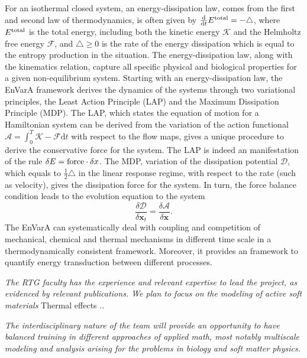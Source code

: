 \documentclass[11pt]{article}
\newcommand{\dd}{\mathrm{d}}
\newcommand{\x}{{\bm x}}
\begin{document}
For an isothermal closed system, an energy-dissipation law, comes from the first and second law of thermodynamics, is often given by $\frac{\dd}{\dd t} E^{\rm total} = - \triangle$,
where $E^{\rm total}$ is the total energy, including both the kinetic energy $\mathcal{K}$ and the Helmholtz free energy $\mathcal{F}$, and $\triangle \geq 0$ is the rate of the energy dissipation which is equal to the entropy production in the situation. The energy-dissipation law, along with the kinematics relation, %
capture all specific physical and biological properties for a given non-equilibrium system. Starting with an energy-dissipation law, the EnVarA framework derives the dynamics of the systems through two variational principles, the Least Action Principle (LAP) and the Maximum Dissipation Principle (MDP). The LAP, which states the equation of motion for a Hamiltonian system
can be derived from the variation of the action functional $\mathcal{A} = \int_{0}^T \mathcal{K} - \mathcal{F} \dd t$ with respect to the flow maps, gives a unique procedure to derive the conservative force for the system. The LAP is indeed an manifestation of the rule $\delta E = {\rm force} \cdot \delta x$. The MDP, variation of the dissipation potential $\mathcal{D}$, which equals to $\frac{1}{2}\triangle$ in the linear response regime, with respect to the rate (such as velocity), gives the dissipation force for the system. In turn, the force balance condition leads to the evolution equation to the system
\begin{equation*}
\frac{\delta \mathcal{D}}{\delta \x_t} = \frac{\delta \mathcal{A}}{\delta \x}.
\end{equation*}
The EnVarA can systematically deal with coupling and competition of mechanical, chemical and thermal mechanisms in different time scale in a thermodynamically consistent framework. Moreover, it provides an framework to quantify energy transduction between different processes.  

\emph{The RTG faculty has the experience and relevant expertise to lead the project, as evidenced by relevant publications. We plan to focus on the modeling of active soft materials} Thermal effects ..

\emph{The interdisciplinary nature of the team will provide an opportunity to have balanced training in different approaches of applied math, most notably multiscale modeling and analysis arising for the problems in biology and soft matter physics.}
\end{document}
